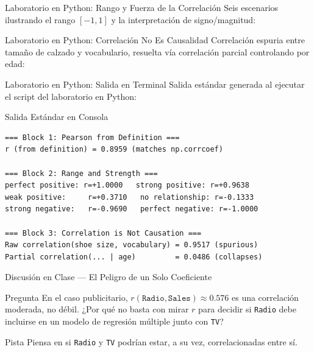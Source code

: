 \documentclass[10pt, aspectratio=169]{beamer}
\begin{document}
\begin{frame}[fragile]{Laboratorio en Python: Rango y Fuerza de la Correlación}
  \scriptsize
  Seis escenarios ilustrando el rango $[-1,1]$ y la interpretación de signo/magnitud:
  {
  }
\end{frame}

\begin{frame}[fragile]{Laboratorio en Python: Correlación No Es Causalidad}
  \scriptsize
  Correlación espuria entre tamaño de calzado y vocabulario, resuelta vía correlación parcial controlando por edad:
  {
  }
\end{frame}

\begin{frame}[fragile]{Laboratorio en Python: Salida en Terminal}
  \scriptsize
  Salida estándar generada al ejecutar el script del laboratorio en Python:
  \vspace{0.02cm}
  \begin{block}{Salida Estándar en Consola}
    \fontsize{3.8pt}{4.6pt}\selectfont
    \begin{verbatim}
=== Block 1: Pearson from Definition ===
r (from definition) = 0.8959 (matches np.corrcoef)

=== Block 2: Range and Strength ===
perfect positive: r=+1.0000   strong positive: r=+0.9638
weak positive:     r=+0.3710   no relationship: r=-0.1333
strong negative:   r=-0.9690   perfect negative: r=-1.0000

=== Block 3: Correlation is Not Causation ===
Raw correlation(shoe size, vocabulary) = 0.9517 (spurious)
Partial correlation(... | age)         = 0.0486 (collapses)
    \end{verbatim}
  \end{block}
\end{frame}

\begin{frame}{Discusión en Clase --- El Peligro de un Solo Coeficiente}
  \footnotesize
  \begin{block}{Pregunta}
    En el caso publicitario, $r(\texttt{Radio},\texttt{Sales})\approx0.576$ es una correlación moderada, no débil. ¿Por qué no basta con mirar $r$ para decidir si \texttt{Radio} debe incluirse en un modelo de regresión múltiple junto con \texttt{TV}?
  \end{block}

  \vspace{0.15cm}
  \pause
  \begin{alertblock}{Pista}
    Piensa en si \texttt{Radio} y \texttt{TV} podrían estar, a su vez, correlacionadas entre sí.
  \end{alertblock}
\end{frame}
\end{document}
